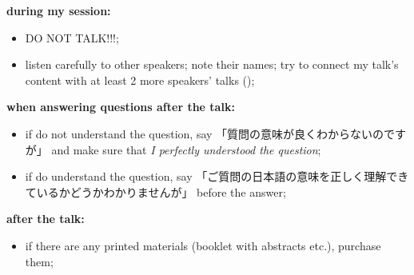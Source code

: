 \documentclass[12pt]{article} %
\begin{document}
	\textbf{during my session:}
	\begin{itemize}
		\item DO NOT TALK!!!;
		\item listen carefully to other speakers; note their names; try to connect my talk's content with at least 2 more speakers' talks ();
	\end{itemize}
	\textbf{when answering questions after the talk:}
	\begin{itemize}
		\item if do not understand the question, say 「質問の意味が良くわからないのですが」 and make sure that \textit{I perfectly understood the question};
		\item if do understand the question, say 「ご質問の日本語の意味を正しく理解できているかどうかわかりませんが」 before the answer;
	\end{itemize}
	\textbf{after the talk:}
	\begin{itemize}
		\item if there are any printed materials (booklet with abstracts etc.), purchase them;
	\end{itemize}
\end{document}
